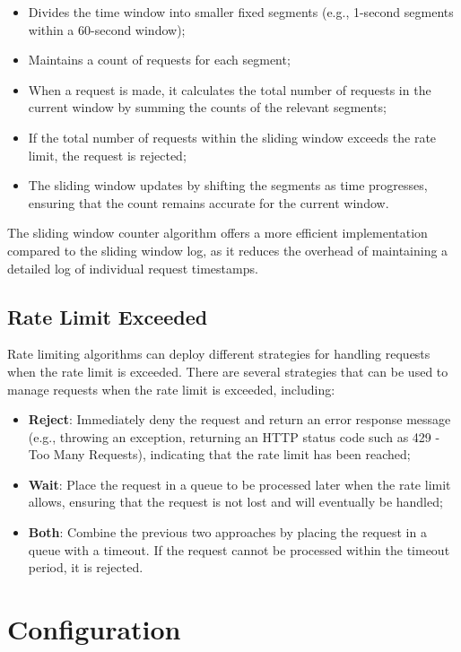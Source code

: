 \begin{itemize}
    \item Divides the time window into smaller fixed segments (e.g., 1-second segments within a 60-second window);
    \item Maintains a count of requests for each segment;
    \item When a request is made, it calculates the total number of requests in the current window by summing the counts of the relevant segments;
    \item If the total number of requests within the sliding window exceeds the rate limit, the request is rejected;
    \item The sliding window updates by shifting the segments as time progresses, ensuring that the count remains accurate for the current window.
\end{itemize}

The sliding window counter algorithm offers a more efficient implementation compared to the sliding window log, as it reduces the overhead of maintaining a detailed log of individual request timestamps.

\subsection{Rate Limit Exceeded}\label{subsec:rate-limiter-exceeded}

Rate limiting algorithms can deploy different strategies for handling requests when the rate limit is exceeded.
There are several strategies that can be used to manage requests when the rate limit is exceeded, including:

\begin{itemize}
    \item \textbf{Reject}: Immediately deny the request and return an error response message (e.g., throwing an exception,
    returning an HTTP status code such as 429 - Too Many Requests), indicating that the rate limit has been reached;
    \item \textbf{Wait}: Place the request in a queue to be processed later when the rate limit allows, ensuring that the request is not lost and will eventually be handled;
    \item \textbf{Both}: Combine the previous two approaches by placing the request in a queue with a timeout.
    If the request cannot be processed within the timeout period, it is rejected.
\end{itemize}


\section{Configuration}\label{sec:rate-limiter-configuration}

